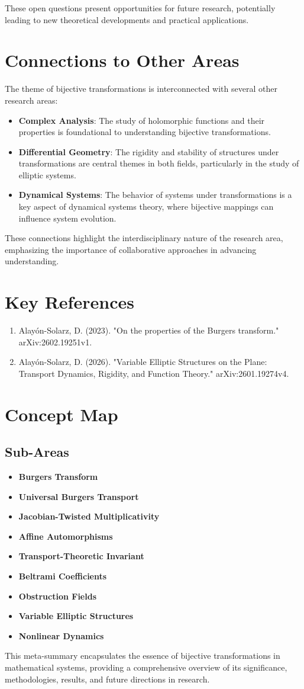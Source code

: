 \documentclass[11pt,a4paper]{article}
\begin{document}
These open questions present opportunities for future research, potentially leading to new theoretical developments and practical applications.

\section{Connections to Other Areas}
The theme of bijective transformations is interconnected with several other research areas:

\begin{itemize}
\item \textbf{Complex Analysis}: The study of holomorphic functions and their properties is foundational to understanding bijective transformations.
\item \textbf{Differential Geometry}: The rigidity and stability of structures under transformations are central themes in both fields, particularly in the study of elliptic systems.
\item \textbf{Dynamical Systems}: The behavior of systems under transformations is a key aspect of dynamical systems theory, where bijective mappings can influence system evolution.
\end{itemize}

These connections highlight the interdisciplinary nature of the research area, emphasizing the importance of collaborative approaches in advancing understanding.

\section{Key References}
\begin{enumerate}
\item Alayón-Solarz, D. (2023). "On the properties of the Burgers transform." arXiv:2602.19251v1.
\item Alayón-Solarz, D. (2026). "Variable Elliptic Structures on the Plane: Transport Dynamics, Rigidity, and Function Theory." arXiv:2601.19274v4.
\end{enumerate}

\section{Concept Map}
\subsection{Sub-Areas}
\begin{itemize}
\item \textbf{Burgers Transform}
\item \textbf{Universal Burgers Transport}
\item \textbf{Jacobian-Twisted Multiplicativity}
\item \textbf{Affine Automorphisms}
\item \textbf{Transport-Theoretic Invariant}
\item \textbf{Beltrami Coefficients}
\item \textbf{Obstruction Fields}
\item \textbf{Variable Elliptic Structures}
\item \textbf{Nonlinear Dynamics}
\end{itemize}

This meta-summary encapsulates the essence of bijective transformations in mathematical systems, providing a comprehensive overview of its significance, methodologies, results, and future directions in research.
\end{document}
